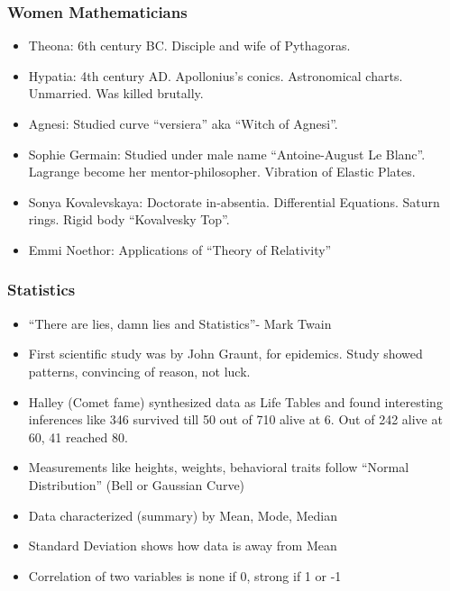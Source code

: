 \begin{frame}[fragile]
\frametitle{Women Mathematicians}
\begin{itemize}[label=\textbullet,noitemsep,nolistsep]
\item Theona: 6th century BC. Disciple and wife of Pythagoras. 
\item Hypatia: 4th century AD. Apollonius's conics. Astronomical charts.  Unmarried. Was killed brutally.
\item Agnesi: Studied curve ``versiera'' aka ``Witch of Agnesi''.
\item Sophie Germain: Studied under male name ``Antoine-August Le Blanc''. Lagrange become her mentor-philosopher. Vibration of Elastic Plates.
\item Sonya Kovalevskaya: Doctorate in-absentia. Differential Equations. Saturn rings. Rigid body ``Kovalvesky Top''.
\item Emmi Noethor: Applications of ``Theory of Relativity''
\end{itemize}
\end{frame}

\begin{frame}[fragile]
\frametitle{Statistics}
\begin{itemize}[label=\textbullet,noitemsep,nolistsep]
\item ``There are lies, damn lies and Statistics''- Mark Twain
\item First scientific study was by John Graunt, for epidemics. Study showed patterns, convincing of reason, not luck.
\item Halley (Comet fame) synthesized data as Life Tables and found interesting inferences like 346 survived till 50 out of 710 alive at 6. Out of 242 alive at 60, 41 reached 80.
\item Measurements like heights, weights, behavioral traits follow ``Normal Distribution'' (Bell or Gaussian Curve)
\item Data characterized (summary) by Mean, Mode, Median
\item Standard Deviation shows how data is away from Mean
\item Correlation of two variables is none if 0, strong if 1 or -1
\end{itemize}
\end{frame}

